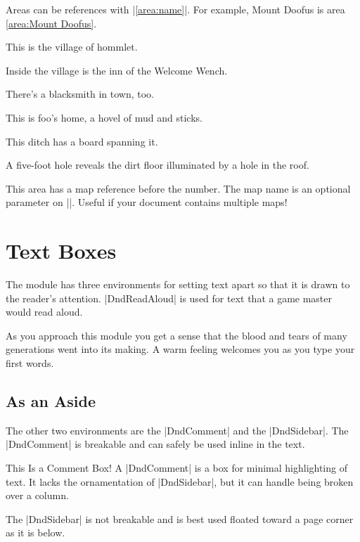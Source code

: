 \documentclass[letterpaper,twocolumn,openany,nodeprecatedcode]{dndbook}
\begin{document}

Areas can be references with |\ref{area:name}|. For example, Mount Doofus is area \ref{area:Mount Doofus}.

This is the village of hommlet.

Inside the village is the inn of the Welcome Wench.

There's a blacksmith in town, too.

This is foo's home, a hovel of mud and sticks.

This ditch has a board spanning it.

A five-foot hole reveals the dirt floor illuminated by a hole in the roof.

This area has a map reference before the number. The map name is an optional parameter on |\DndArea|. Useful if your document contains multiple maps!

\chapter{Text Boxes}

The module has three environments for setting text apart so that it is drawn to the reader's attention. |DndReadAloud| is used for text that a game master would read aloud.

\begin{DndReadAloud}
  As you approach this module you get a sense that the blood and tears of many generations went into its making. A warm feeling welcomes you as you type your first words.
\end{DndReadAloud}

\section{As an Aside}
The other two environments are the |DndComment| and the |DndSidebar|. The |DndComment| is breakable and can safely be used inline in the text.

\begin{DndComment}{This Is a Comment Box!}
  A |DndComment| is a box for minimal highlighting of text. It lacks the ornamentation of |DndSidebar|, but it can handle being broken over a column.
\end{DndComment}

The |DndSidebar| is not breakable and is best used floated toward a page corner as it is below.
\end{document}
